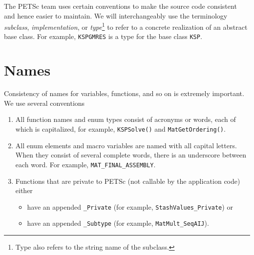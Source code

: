 The PETSc team uses certain conventions to make the source code consistent and hence easier to maintain. We will interchangeably use the
terminology {\em subclass}, {\em implementation}, or {\em type}\footnote{Type also refers to the string name of the subclass.}
to refer to a concrete realization of an abstract base class. For example, \lstinline{KSPGMRES} is a type for the base class \lstinline{KSP}.

\section{Names}\label{sec:stylenames}
Consistency of names for variables, functions, and so on is extremely
important.
We use several conventions
\begin{enumerate}
\item All function names and enum types consist of acronyms or words, each of
  which is capitalized, for example, \lstinline{KSPSolve()} and
      \lstinline{MatGetOrdering()}.
\item All enum elements and macro variables are named with all capital letters. When
      they consist of several complete words, there is an underscore between each word.
      For example, \lstinline{MAT_FINAL_ASSEMBLY}.
\item Functions that are private to PETSc (not callable by the
      application code) either
      \begin{itemize}
        \item have an appended \lstinline{_Private} (for example,
           \lstinline{StashValues_Private}) or
        \item have an appended \lstinline{_Subtype} (for example,
           \lstinline{MatMult_SeqAIJ}).
      \end{itemize}


\end{enumerate}
